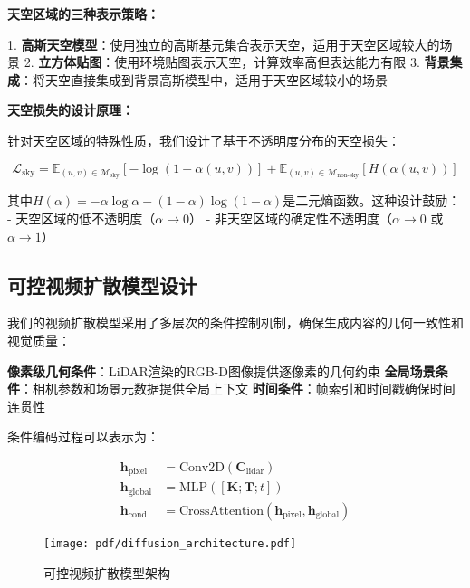 \textbf{天空区域的三种表示策略：}

1. \textbf{高斯天空模型}：使用独立的高斯基元集合表示天空，适用于天空区域较大的场景
2. \textbf{立方体贴图}：使用环境贴图表示天空，计算效率高但表达能力有限
3. \textbf{背景集成}：将天空直接集成到背景高斯模型中，适用于天空区域较小的场景

\textbf{天空损失的设计原理：}

针对天空区域的特殊性质，我们设计了基于不透明度分布的天空损失：

\begin{equation}
\mathcal{L}_{\text{sky}} = \mathbb{E}_{(u,v) \in \mathcal{M}_{\text{sky}}} [-\log(1-\alpha(u,v))] + \mathbb{E}_{(u,v) \in \mathcal{M}_{\text{non-sky}}} [H(\alpha(u,v))]
\label{eq:sky_loss_design}
\end{equation}

其中$H(\alpha) = -\alpha \log \alpha - (1-\alpha) \log(1-\alpha)$是二元熵函数。这种设计鼓励：
- 天空区域的低不透明度（$\alpha \rightarrow 0$）
- 非天空区域的确定性不透明度（$\alpha \rightarrow 0$ 或 $\alpha \rightarrow 1$）

\subsection{可控视频扩散模型设计}

我们的视频扩散模型采用了多层次的条件控制机制，确保生成内容的几何一致性和视觉质量：

\textbf{像素级几何条件}：LiDAR渲染的RGB-D图像提供逐像素的几何约束
\textbf{全局场景条件}：相机参数和场景元数据提供全局上下文
\textbf{时间条件}：帧索引和时间戳确保时间连贯性

条件编码过程可以表示为：

\begin{align}
\mathbf{h}_{\text{pixel}} &= \text{Conv2D}(\mathbf{C}_{\text{lidar}}) \\
\mathbf{h}_{\text{global}} &= \text{MLP}([\mathbf{K}; \mathbf{T}; t]) \\
\mathbf{h}_{\text{cond}} &= \text{CrossAttention}(\mathbf{h}_{\text{pixel}}, \mathbf{h}_{\text{global}})
\label{eq:condition_encoding_multilevel}
\end{align}

\begin{figure}[htbp]
  \centering
  \texttt{[image: pdf/diffusion\_architecture.pdf]}
  \caption{可控视频扩散模型架构}
  \label{fig:diffusion-architecture}
\end{figure}

